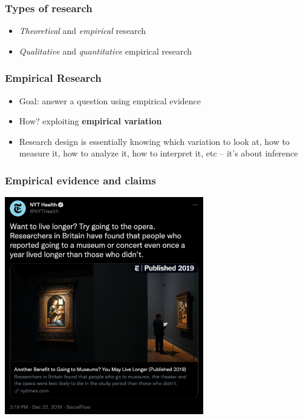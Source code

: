 \documentclass[aspectratio=43]{beamer}
\begin{document}
\begin{frame}
\frametitle{Types of research}
\centering

\begin{itemize}
  \item \textit{Theoretical} and \textit{empirical} research
  \item \textit{Qualitative} and \textit{quantitative} empirical research
\end{itemize}

\end{frame}

\begin{frame}
\frametitle{Empirical Research}
\centering

\begin{itemize}
  \item Goal: answer a question using empirical evidence
  \item How? exploiting \textbf{empirical variation}
  \item Research design is essentially knowing which variation to look at, how to measure it, how to analyze it, how to interpret it, etc -- it's about inference
\end{itemize}

\end{frame}

\begin{frame}
\frametitle{Empirical evidence and claims}
\centering

\includegraphics[width = 0.65\textwidth]{../img/nyt_museums}

\end{frame}
\end{document}
